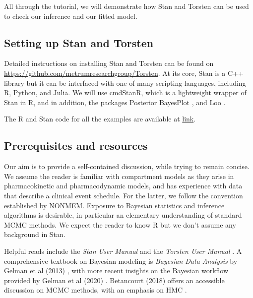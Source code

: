 All through the tutorial, we will demonstrate how Stan and Torsten can be used to check our inference and our fitted model.

\subsection{Setting up Stan and Torsten}

Detailed instructions on installing Stan and Torsten can be found on \url{https://github.com/metrumresearchgroup/Torsten}.
At its core, Stan is a C++ library but it can be interfaced with one of many scripting languages, including R, Python, and Julia.
We will use cmdStanR, which is a lightweight wrapper of Stan in R, and
in addition, the packages Posterior \cite{Bukner:2020} BayesPlot \cite{Gabry:2021}, and Loo \cite{Gabry:2020}.

The R and Stan code for all the examples are available at \url{link}.

 \subsection{Prerequisites and resources}
 
 Our aim is to provide a self-contained discussion, while trying to remain concise.
 We assume the reader is familiar with compartment models as they arise in pharmacokinetic and pharmacodynamic models, and has experience with data that describe a clinical event schedule.
 For the latter, we follow the convention established by NONMEM.
 Exposure to Bayesian statistics and inference algorithms is desirable, in particular an elementary understanding of standard MCMC methods.
 We expect the reader to know R but we don't assume any background in Stan.
 
 Helpful reads include the \textit{Stan User Manual} \cite{Stan:2021} and the \textit{Torsten User Manual} \cite{Torsten:2021}.
 A comprehensive textbook on Bayesian modeling is \textit{Bayesian Data Analysis} by Gelman et al (2013) \cite{Gelman:2013b}, with more recent insights on the Bayesian workflow provided by Gelman et al (2020) \cite{Gelman:2020}. 
 Betancourt (2018) offers an accessible discussion on MCMC methods, with an emphasis on HMC \cite{Betancourt:2018}.
   
 
 